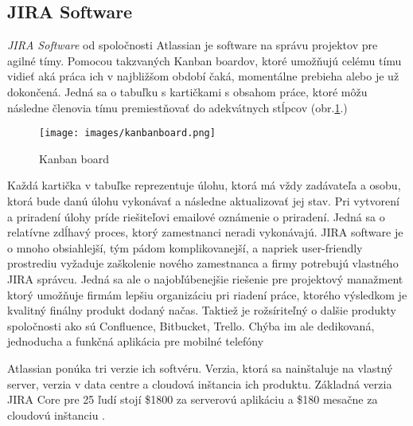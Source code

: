 \vspace{10pt}
\subsection{JIRA Software}


\textit{JIRA Software} od spoločnosti Atlassian je software na správu projektov pre agilné tímy. Pomocou takzvaných Kanban boardov, ktoré umožňujú celému tímu vidieť aká práca ich v najbližšom období čaká, momentálne prebieha alebo je už dokončená. Jedná sa o tabuľku s kartičkami s obsahom práce, ktoré môžu následne členovia tímu premiestňovať do adekvátnych stĺpcov (obr.\ref{obr2.1}.)



\begin{figure}[ht]
    \begin{center}
        \begin{minipage}{0.99\linewidth}
            \begin{center}
                \texttt{[image: images/kanbanboard.png]}
                \caption{Kanban board}
                \label{obr2.1}
            \end{center}
        \end{minipage}
    \end{center}
\end{figure}

\vspace{10pt}

Každá kartička v tabuľke reprezentuje úlohu, ktorá má vždy zadávateľa a osobu, ktorá bude danú úlohu vykonávať a následne aktualizovať jej stav. Pri vytvorení a priradení úlohy príde riešiteľovi emailové oznámenie o priradení. Jedná sa o relatívne zdĺhavý proces, ktorý zamestnanci neradi vykonávajú. JIRA software je o mnoho obsiahlejší, tým pádom komplikovanejší, a napriek user-friendly prostrediu vyžaduje zaškolenie nového zamestnanca a firmy potrebujú vlastného JIRA správcu. Jedná sa ale o najobľúbenejšie riešenie pre projektový manažment ktorý umožňuje firmám lepšiu organizáciu pri riadení práce, ktorého výsledkom je kvalitný finálny produkt dodaný načas. Taktiež je rožsíriteľný o dalšie produkty spoločnosti ako sú Confluence, Bitbucket, Trello. Chýba im ale dedikovaná, jednoducha a funkčná aplikácia pre mobilné telefóny

Atlassian ponúka tri verzie ich softvéru. Verzia, ktorá sa nainštaluje na vlastný server, verzia v data centre a cloudová inštancia ich produktu. Základná verzia JIRA Core pre 25 ľudí stojí  \$1800 za serverovú aplikáciu a \$180 mesačne za cloudovú inštanciu .

